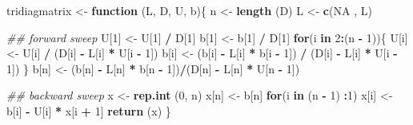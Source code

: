 \documentclass[]{book}
\newenvironment{Shaded}{\begin{snugshade}}{\end{snugshade}}
\newcommand{\CommentTok}[1]{\textcolor[rgb]{0.56,0.35,0.01}{\textit{#1}}}
\newcommand{\ControlFlowTok}[1]{\textcolor[rgb]{0.13,0.29,0.53}{\textbf{#1}}}
\newcommand{\DecValTok}[1]{\textcolor[rgb]{0.00,0.00,0.81}{#1}}
\newcommand{\KeywordTok}[1]{\textcolor[rgb]{0.13,0.29,0.53}{\textbf{#1}}}
\newcommand{\NormalTok}[1]{#1}
\newcommand{\OperatorTok}[1]{\textcolor[rgb]{0.81,0.36,0.00}{\textbf{#1}}}
\newcommand{\OtherTok}[1]{\textcolor[rgb]{0.56,0.35,0.01}{#1}}
\newcommand{\StringTok}[1]{\textcolor[rgb]{0.31,0.60,0.02}{#1}}
\theoremstyle{definition}
\theoremstyle{definition}
\theoremstyle{definition}
\theoremstyle{remark}
\begin{document}
\begin{Shaded}
\begin{Highlighting}[]
\NormalTok{tridiagmatrix <-}\StringTok{ }\ControlFlowTok{function}\NormalTok{ (L, D, U, b)\{}
\NormalTok{  n <-}\StringTok{ }\KeywordTok{length}\NormalTok{ (D)}
\NormalTok{  L <-}\StringTok{ }\KeywordTok{c}\NormalTok{(}\OtherTok{NA}\NormalTok{ , L)}
  
  \CommentTok{## forward sweep}
\NormalTok{  U[}\DecValTok{1}\NormalTok{] <-}\StringTok{ }\NormalTok{U[}\DecValTok{1}\NormalTok{] }\OperatorTok{/}\StringTok{ }\NormalTok{D[}\DecValTok{1}\NormalTok{]}
\NormalTok{  b[}\DecValTok{1}\NormalTok{] <-}\StringTok{ }\NormalTok{b[}\DecValTok{1}\NormalTok{] }\OperatorTok{/}\StringTok{ }\NormalTok{D[}\DecValTok{1}\NormalTok{]}
  \ControlFlowTok{for}\NormalTok{(i }\ControlFlowTok{in} \DecValTok{2}\OperatorTok{:}\NormalTok{(n }\OperatorTok{-}\StringTok{ }\DecValTok{1}\NormalTok{))\{}
\NormalTok{      U[i] <-}\StringTok{ }\NormalTok{U[i] }\OperatorTok{/}\StringTok{ }\NormalTok{(D[i] }\OperatorTok{-}\StringTok{ }\NormalTok{L[i] }\OperatorTok{*}\StringTok{ }\NormalTok{U[i }\OperatorTok{-}\StringTok{ }\DecValTok{1}\NormalTok{])}
\NormalTok{      b[i] <-}\StringTok{ }\NormalTok{(b[i] }\OperatorTok{-}\StringTok{ }\NormalTok{L[i] }\OperatorTok{*}\StringTok{ }\NormalTok{b[i }\OperatorTok{-}\StringTok{ }\DecValTok{1}\NormalTok{]) }\OperatorTok{/}
\StringTok{      }\NormalTok{(D[i] }\OperatorTok{-}\StringTok{ }\NormalTok{L[i] }\OperatorTok{*}\StringTok{ }\NormalTok{U[i }\OperatorTok{-}\StringTok{ }\DecValTok{1}\NormalTok{])}
\NormalTok{  \}}
\NormalTok{  b[n] <-}\StringTok{ }\NormalTok{(b[n] }\OperatorTok{-}\StringTok{ }\NormalTok{L[n] }\OperatorTok{*}\StringTok{ }\NormalTok{b[n }\OperatorTok{-}\StringTok{ }\DecValTok{1}\NormalTok{])}\OperatorTok{/}\NormalTok{(D[n] }\OperatorTok{-}\StringTok{ }\NormalTok{L[n] }\OperatorTok{*}\StringTok{ }\NormalTok{U[n }\OperatorTok{-}\StringTok{ }\DecValTok{1}\NormalTok{])}
  
  \CommentTok{## backward sweep}
\NormalTok{  x <-}\StringTok{ }\KeywordTok{rep.int}\NormalTok{ (}\DecValTok{0}\NormalTok{, n)}
\NormalTok{  x[n] <-}\StringTok{ }\NormalTok{b[n]}
  \ControlFlowTok{for}\NormalTok{(i }\ControlFlowTok{in}\NormalTok{ (n }\OperatorTok{-}\StringTok{ }\DecValTok{1}\NormalTok{) }\OperatorTok{:}\DecValTok{1}\NormalTok{)}
\NormalTok{      x[i] <-}\StringTok{ }\NormalTok{b[i] }\OperatorTok{-}\StringTok{ }\NormalTok{U[i] }\OperatorTok{*}\StringTok{ }\NormalTok{x[i }\OperatorTok{+}\StringTok{ }\DecValTok{1}\NormalTok{]}
  \KeywordTok{return}\NormalTok{ (x)}
\NormalTok{\}}
\end{Highlighting}
\end{Shaded}
\end{document}

